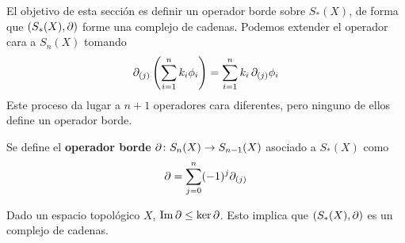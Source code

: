 El objetivo de esta sección es definir un operador borde sobre $S_*(X)$, de
forma que $(S_*(X),\partial)$ forme una complejo de cadenas. Podemos extender el
operador cara a $S_n(X)$ tomando
\[\partial_{(j)}\left(\sum_{i=1}^n k_i\phi_i\right)= \sum^n_{i=1}k_i\,\partial_{(j)}\phi_i\]
Este proceso da lugar a $n+1$ operadores cara diferentes, pero ninguno de ellos
define un operador borde.

\begin{definition}
Se define el \textbf{operador borde} $\partial\colon S_n(X) \to
S_{n-1}(X)$ asociado a $S_*(X)$ como
\[\partial=\sum^n_{j=0}(-1)^j\partial_{(j)}\]
\end{definition}

\begin{theorem}
Dado un espacio topológico $X$, $\operatorname{Im} \partial \leq \ker \partial$. Esto implica que $(S_*(X),\partial)$ es un complejo de cadenas.
\end{theorem}


